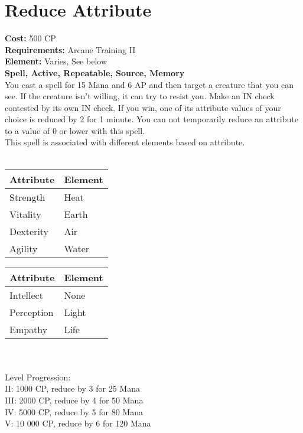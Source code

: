 \section{Reduce Attribute}
\textbf{Cost:} 500 CP\\
\textbf{Requirements:} Arcane Training II\\
\textbf{Element:} Varies, See below\\
\textbf{Spell, Active, Repeatable, Source, Memory}\\
You cast a spell for 15 Mana and 6 AP and then target a creature that you can see. If the creature isn’t willing, it can try to resist you. Make an IN check contested by its own IN check. If you win, one of its attribute values of your choice is reduced by 2 for 1 minute. You can not temporarily reduce an attribute to a value of 0 or lower with this spell. \\
This spell is associated with different elements based on attribute.\\
\\
\begin{minipage}{0.5\textwidth}
	\begin{tabular}{l | l} 
		Attribute & Element\\ \hline
		Strength & Heat\\
		Vitality & Earth\\
		Dexterity & Air\\
		Agility & Water\\
	\end{tabular}
\end{minipage}
\begin{minipage}{0.5\textwidth}
	\begin{tabular}{l | l}
		Attribute & Element\\ \hline
		Intellect & None\\
		Perception & Light\\
		Empathy & Life\\
	\end{tabular}
\end{minipage}
\\
\\
Level Progression:\\
II: 1000 CP, reduce by 3 for 25 Mana\\
III: 2000 CP, reduce by 4 for 50 Mana\\
IV: 5000 CP, reduce by 5 for 80 Mana\\
V: 10 000 CP, reduce by 6 for 120 Mana\\